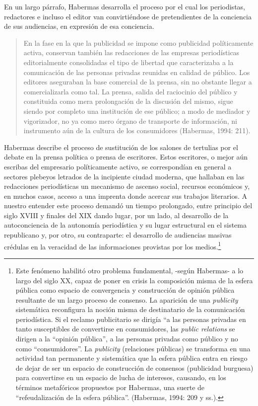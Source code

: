 En un largo párrafo, Habermas desarrolla el proceso por el cual los periodistas, redactores e incluso el editor van convirtiéndose de pretendientes de la conciencia de sus audiencias, en expresión de esa conciencia.

\begin{quote}
En la fase en la que la publicidad se impone como publicidad políticamente activa, conservan también las redacciones de las empresas periodísticas editorialmente consolidadas el tipo de libertad que caracterizaba a la comunicación de las personas privadas reunidas en calidad de público. Los editores aseguraban la base comercial de la prensa, sin no obstante llegar a comercializarla como tal. La prensa, salida del raciocinio del público y constituida como mera prolongación de la discusión del mismo, sigue siendo por completo una institución de ese público; a modo de mediador y vigorizador, no ya como mero órgano de transporte de información, ni instrumento aún de la cultura de los consumidores (Habermas, 1994: 211).
\end{quote}

Habermas describe el proceso de sustitución de los salones de tertulias por el debate en la prensa política o prensa de escritores. Estos escritores, o mejor aún escribas del empresario políticamente activo, se correspondían en general a sectores plebeyos letrados de la incipiente ciudad moderna, que hallaban en las redacciones periodísticas un mecanismo de ascenso social, recursos económicos y, en muchos casos, acceso a una imprenta donde acercar sus trabajos literarios. A nuestro entender este proceso demandó un tiempo prolongado, entre principio del siglo XVIII y finales del XIX dando lugar, por un lado, al desarrollo de la autoconciencia de la autonomía periodística y su lugar estructural en el sistema republicano y, por otro, su contraparte: el desarrollo de audiencias masivas crédulas en la veracidad de las informaciones provistas por los medios.\footnote{Este fenómeno habilitó otro problema fundamental, -según Habermas- a lo largo del siglo XX, capaz de poner en crisis la composición misma de la esfera pública como espacio de convergencia y construcción de opinión pública resultante de un largo proceso de consenso. La aparición de una \emph{publicity} sistemática reconfigura la noción misma de destinatario de la comunicación periodística. Si el reclamo publicitario se dirigía ``a las personas privadas en tanto susceptibles de convertirse en consumidores, las \emph{public relations} se dirigen a la ``opinión pública'', a las personas privadas como público y no como ``consumidores''. La \emph{publicity} (relaciones públicas) se transforma en una actividad tan permanente y sistemática que la esfera pública entra en riesgo de dejar de ser un espacio de construcción de consensos (publicidad burguesa) para convertirse en un espacio de lucha de intereses, causando, en los términos metafóricos propuestos por Habermas, una suerte de ``refeudalización de la esfera pública''. (Habermas, 1994: 209 y ss.).}

